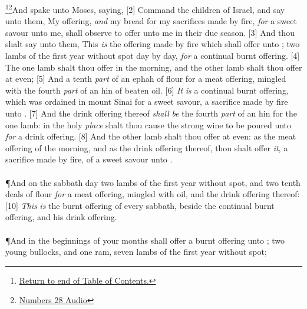 \footnote{\textcolor[rgb]{0.00,0.25,0.00}{\hyperlink{NumbersTOC}{Return to end of Table of Contents.}}}\footnote{\href{https://audiobible.com/bible/numbers_28.html}{\textcolor[cmyk]{0.99998,1,0,0}{Numbers 28 Audio}}}\textcolor[cmyk]{0.99998,1,0,0}{And  spake unto Moses, saying,}
[2] \textcolor[cmyk]{0.99998,1,0,0}{Command the children of Israel, and say unto them, My offering, \emph{and} my bread for my sacrifices made by fire, \emph{for} a sweet savour unto me, shall  observe to offer unto me in their due season.}
[3] \textcolor[cmyk]{0.99998,1,0,0}{And thou shalt say unto them, This \emph{is} the offering made by fire which  shall offer unto ; two lambs of the first year without spot day by day, \emph{for} a continual burnt offering.}
[4] \textcolor[cmyk]{0.99998,1,0,0}{The one lamb shalt thou offer in the morning, and the other lamb shalt thou offer at even;}
[5] \textcolor[cmyk]{0.99998,1,0,0}{And a tenth \emph{part} of an ephah of flour for a meat offering, mingled with the fourth \emph{part} of an hin of beaten oil.}
[6] \textcolor[cmyk]{0.99998,1,0,0}{\emph{It} \emph{is} a continual burnt offering, which was ordained in mount Sinai for a sweet savour, a sacrifice made by fire unto .}
[7] \textcolor[cmyk]{0.99998,1,0,0}{And the drink offering thereof \emph{shall} \emph{be} the fourth \emph{part} of an hin for the one lamb: in the holy \emph{place} shalt thou cause the strong wine to be poured unto  \emph{for} a drink offering.}
[8] \textcolor[cmyk]{0.99998,1,0,0}{And the other lamb shalt thou offer at even: as the meat offering of the morning, and as the drink offering thereof, thou shalt offer \emph{it}, a sacrifice made by fire, of a sweet savour unto .}\\
\\
\P \textcolor[cmyk]{0.99998,1,0,0}{And on the sabbath day two lambs of the first year without spot, and two tenth deals of flour \emph{for} a meat offering, mingled with oil, and the drink offering thereof:}
[10] \textcolor[cmyk]{0.99998,1,0,0}{\emph{This} \emph{is} the burnt offering of every sabbath, beside the continual burnt offering, and his drink offering.}\\
\\
\P \textcolor[cmyk]{0.99998,1,0,0}{And in the beginnings of your months  shall offer a burnt offering unto  ; two young bullocks, and one ram, seven lambs of the first year without spot;}
